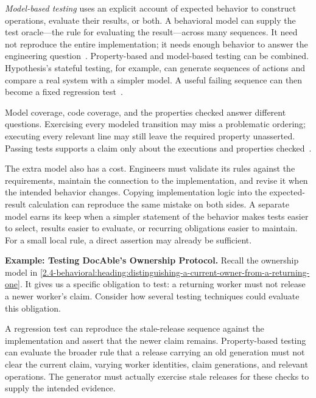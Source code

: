 \emph{Model-based testing} uses an explicit account of expected behavior to construct operations, evaluate their results, or both. A behavioral model can supply the test oracle---the rule for evaluating the result---across many sequences. It need not reproduce the entire implementation; it needs enough behavior to answer the engineering question~\citep{utting2012taxonomy}. Property-based and model-based testing can be combined. Hypothesis's stateful testing, for example, can generate sequences of actions and compare a real system with a simpler model. A useful failing sequence can then become a fixed regression test~\citep{hypothesis-stateful}.

Model coverage, code coverage, and the properties checked answer different questions. Exercising every modeled transition may miss a problematic ordering; executing every relevant line may still leave the required property unasserted. Passing tests supports a claim only about the executions and properties checked~\citep{winters2020}.

The extra model also has a cost. Engineers must validate its rules against the requirements, maintain the connection to the implementation, and revise it when the intended behavior changes. Copying implementation logic into the expected-result calculation can reproduce the same mistake on both sides. A separate model earns its keep when a simpler statement of the behavior makes tests easier to select, results easier to evaluate, or recurring obligations easier to maintain. For a small local rule, a direct assertion may already be sufficient.

\textbf{Example: Testing DocAble's Ownership Protocol.} Recall the ownership model in \autoref{2.4-behavioral:heading:distinguishing-a-current-owner-from-a-returning-one}. It gives us a specific obligation to test: a returning worker must not release a newer worker's claim. Consider how several testing techniques could evaluate this obligation.

A regression test can reproduce the stale-release sequence against the implementation and assert that the newer claim remains. Property-based testing can evaluate the broader rule that a release carrying an old generation must not clear the current claim, varying worker identities, claim generations, and relevant operations. The generator must actually exercise stale releases for these checks to supply the intended evidence.

